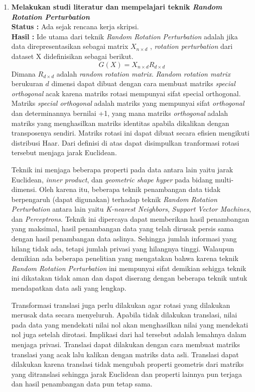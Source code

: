 \documentclass[a4paper,twoside]{article}
\begin{document}
\begin{enumerate}
		\item \textbf{Melakukan studi literatur dan mempelajari teknik \textit{Random Rotation Perturbation}}\\
		{\bf Status :} Ada sejak rencana kerja skripsi.\\
		{\bf Hasil :} Ide utama dari teknik \textit{Random Rotation Perturbation} adalah jika data direpresentasikan sebagai matrix \(X_{n \times d}\) , \textit{rotation perturbation} dari dataset X didefinisikan sebagai berikut.
		\begin{equation}
			G(X) = X_{n \times d} R_{d \times d}
		\end{equation}
		Dimana \(R_{d \times d}\) adalah \textit{random rotation matrix}. \textit{Random rotation matrix} berukuran \(d\) dimensi dapat dibuat dengan cara membuat matriks \textit{special orthogonal} acak karena matriks rotasi mempunyai sifat {special orthogonal}. Matriks \textit{special orthogonal} adalah matriks yang mempunyai sifat \textit{orthogonal} dan determinannya bernilai +1, yang mana matriks \textit{orthogonal} adalah matriks yang menghasilkan matriks identitas apabila dikalikan dengan transposenya sendiri. Matriks rotasi ini dapat dibuat secara efisien mengikuti distribusi Haar. Dari definisi di atas dapat disimpulkan tranformasi rotasi tersebut menjaga jarak Euclidean.
		
		Teknik ini menjaga beberapa properti pada data antara lain yaitu jarak Euclidean, \textit{inner product}, dan \textit{geometric shape hyper} pada bidang multi-dimensi. Oleh karena itu, beberapa teknik penambangan data tidak berpengaruh (dapat digunakan) terhadap teknik \textit{Random Rotation Perturbation} antara lain yaitu \textit{K-nearest Neighbors}, \textit{Support Vector Machines}, dan \textit{Perceptrons}. Teknik ini dipercaya dapat memberikan hasil penambangan yang maksimal, hasil penambangan data yang telah dirusak persis sama dengan hasil penambangan data aslinya. Sehingga jumlah informasi yang hilang tidak ada, tetapi jumlah privasi yang hilangnya tinggi. Walaupun demikian ada beberapa penelitian yang mengatakan bahwa karena teknik \textit{Random Rotation Perturbation} ini mempunyai sifat demikian sehigga teknik ini dikatakan tidak aman dan dapat diserang dengan beberapa teknik untuk mendapatkan data asli yang lengkap.
		
		Transformasi translasi juga perlu dilakukan agar rotasi yang dilakukan merusak data secara menyeluruh. Apabila tidak dilakukan translasi, nilai pada data yang mendekati nilai nol akan menghasilkan nilai yang mendekati nol juga setelah dirotasi. Implikasi dari hal tersebut adalah lemahnya dalam menjaga privasi. Translasi dapat dilakukan dengan cara membuat matriks translasi yang acak lalu kalikan dengan matriks data asli. Translasi dapat dilakukan karena translasi tidak mengubah properti geometris dari matriks yang ditranslasi sehingga jarak Euclidean dan properti lainnya pun terjaga dan hasil penambangan data pun tetap sama.


\end{enumerate}
\end{document}
